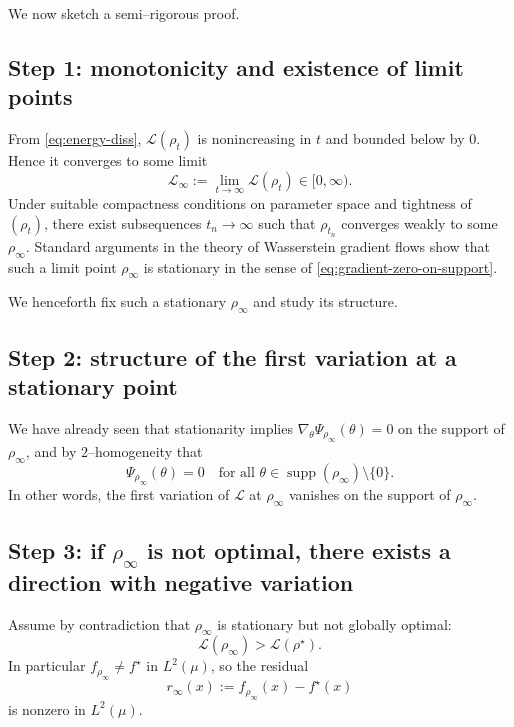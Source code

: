 \documentclass[11pt]{article}
\numberwithin{equation}{section}
\theoremstyle{definition}
\newcommand{\1}{\mathbbm{1}}
\begin{document}
We now sketch a semi--rigorous proof.

\subsection{Step 1: monotonicity and existence of limit points}

From \eqref{eq:energy-diss}, $\mathcal{L}(\rho_t)$ is nonincreasing in $t$ and bounded below by $0$. Hence it converges to some limit
\[
\mathcal{L}_\infty := \lim_{t\to\infty}\mathcal{L}(\rho_t)\in[0,\infty).
\]
Under suitable compactness conditions on parameter space and tightness of $(\rho_t)$, there exist subsequences $t_n\to\infty$ such that $\rho_{t_n}$ converges weakly to some $\rho_\infty$. Standard arguments in the theory of Wasserstein gradient flows show that such a limit point $\rho_\infty$ is stationary in the sense of \eqref{eq:gradient-zero-on-support}.

We henceforth fix such a stationary $\rho_\infty$ and study its structure.

\subsection{Step 2: structure of the first variation at a stationary point}

We have already seen that stationarity implies $\nabla_\theta \Psi_{\rho_\infty}(\theta)=0$ on the support of $\rho_\infty$, and by $2$--homogeneity that
\begin{equation}
\Psi_{\rho_\infty}(\theta) = 0
\quad\text{for all }\theta\in\operatorname{supp}(\rho_\infty)\setminus\{0\}.
\end{equation}
In other words, the first variation of $\mathcal{L}$ at $\rho_\infty$ vanishes on the support of $\rho_\infty$.

\subsection{Step 3: if $\rho_\infty$ is not optimal, there exists a direction with negative variation}

Assume by contradiction that $\rho_\infty$ is stationary but not globally optimal:
\begin{equation}
\mathcal{L}(\rho_\infty) > \mathcal{L}(\rho^\star).
\end{equation}
In particular $f_{\rho_\infty}\neq f^\star$ in $L^2(\mu)$, so the residual
\[
r_\infty(x) := f_{\rho_\infty}(x) - f^\star(x)
\]
is nonzero in $L^2(\mu)$.
\end{document}
